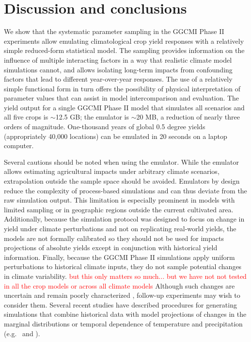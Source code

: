 \documentclass[gmd, manuscript]{copernicus} %
\begin{document}
\section{Discussion and conclusions} 
\label{S:6}
We show that the systematic parameter sampling in the GGCMI Phase II experiments allow emulating climatological crop yield responses with a relatively simple reduced-form statistical model. 
The sampling provides information on the influence of multiple interacting factors in a way that realistic climate model simulations cannot, and allows isolating long-term impacts from confounding factors that lead to different year-over-year responses. 
The use of a relatively simple functional form in turn offers the possibility of physical interpretation of parameter values that can assist in model intercomparison and evaluation. 
The yield output for a single GGCMI Phase II model that simulates all scenarios and all five crops is $\sim$12.5 GB; the emulator is $\sim$20 MB, a reduction of nearly three orders of magnitude.
One-thousand years of global 0.5 degree yields (appropriately 40,000 locations) can be emulated in 20 seconds on a laptop computer. 

Several cautions should be noted when using the emulator. 
While the emulator allows estimating agricultural impacts under arbitrary climate scenarios, extrapolation outside the sample space should be avoided. 
Emulators by design reduce the complexity of process-based simulations and can thus deviate from the raw simulation output. 
This limitation is especially prominent in models with limited sampling or in geographic regions outside the current cultivated area.
Additionally, because the simulation protocol was designed to focus on change in yield under climate perturbations and not on replicating real-world yields, the models are not formally calibrated so they should not be used for impacts projections of absolute yields except in conjunction with historical yield information. 
Finally, because the GGCMI Phase II simulations apply uniform perturbations to historical climate inputs, they do not sample potential changes in climate variability. 
\textcolor{red}{but this only matters so much... but we have not not tested in all the crop models or across all climate models}
Although such changes are uncertain and remain poorly characterized \citep[e.g.][]{Alexande2006, Kodra2014}, follow-up experiments may wish to consider them. 
Several recent studies have described procedures for generating simulations that combine historical data with model projections of changes in the marginal distributions or temporal dependence of temperature and precipitation (e.g.\ \citet{Leeds2015, poppick2016, Won16} and \citet{Haugen2018}).
\end{document}
